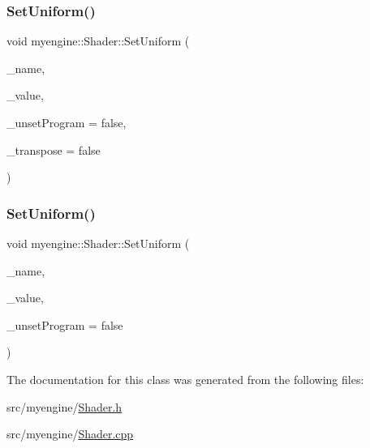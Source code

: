 \subsubsection{\texorpdfstring{Set\+Uniform()}{SetUniform()}\hspace{0.1cm}{\footnotesize\ttfamily [3/4]}}
{\footnotesize\ttfamily void myengine\+::\+Shader\+::\+Set\+Uniform (\begin{DoxyParamCaption}\item[{G\+Lchar $\ast$}]{\+\_\+name,  }\item[{glm\+::mat4}]{\+\_\+value,  }\item[{bool}]{\+\_\+unset\+Program = {\ttfamily false},  }\item[{bool}]{\+\_\+transpose = {\ttfamily false} }\end{DoxyParamCaption})}

\mbox{\label{classmyengine_1_1_shader_a63e19986143ad7857d270e22ea0a4ff0}} 
\subsubsection{\texorpdfstring{Set\+Uniform()}{SetUniform()}\hspace{0.1cm}{\footnotesize\ttfamily [4/4]}}
{\footnotesize\ttfamily void myengine\+::\+Shader\+::\+Set\+Uniform (\begin{DoxyParamCaption}\item[{G\+Lchar $\ast$}]{\+\_\+name,  }\item[{glm\+::vec3}]{\+\_\+value,  }\item[{bool}]{\+\_\+unset\+Program = {\ttfamily false} }\end{DoxyParamCaption})}



The documentation for this class was generated from the following files\+:\begin{DoxyCompactItemize}
\item 
src/myengine/\hyperlink{_shader_8h}{Shader.\+h}\item 
src/myengine/\hyperlink{_shader_8cpp}{Shader.\+cpp}\end{DoxyCompactItemize}
